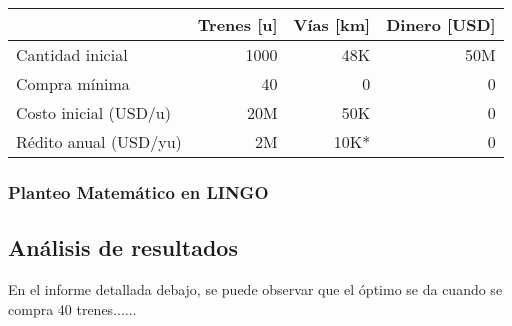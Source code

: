 \documentclass[10pt, a4paper, titlepage,
	oneside,
	fleqn, leqno]{article}
\begin{document}
\begin{tabular}{|l|r|r|r|} \hline
    & Trenes [u] & Vías [km] & Dinero [USD]\\ \hline
  Cantidad inicial & 1000 & 48K & 50M\\ \hline
  Compra mínima & 40 & 0 & 0\\ \hline
  Costo inicial (USD/u) & 20M & 50K & 0\\ \hline
  Rédito anual (USD/yu) & 2M & 10K* & 0\\ \hline
\end{tabular}

\subsubsection{Planteo Matemático en LINGO}


\subsection{Análisis de resultados}
En el informe detallada debajo, se puede observar que el óptimo se da cuando se compra 40 trenes......
\end{document}
